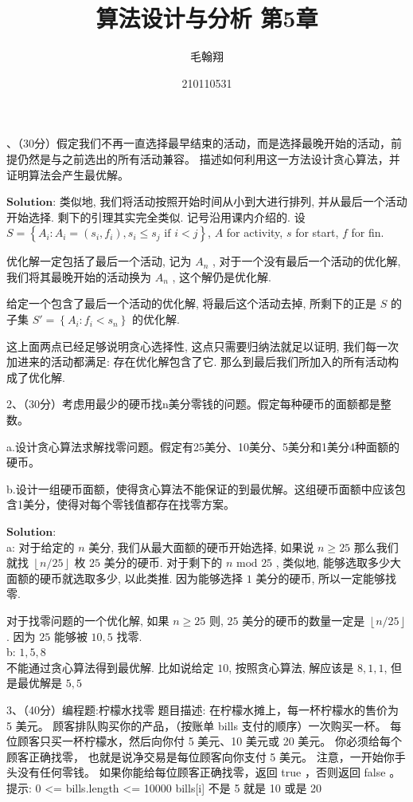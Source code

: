 \documentclass[a4paper, 10pt]{ctexart} %
\title{算法设计与分析 第5章}
\author{毛翰翔 \and 210110531}
\begin{document}
、（30分）假定我们不再一直选择最早结束的活动，而是选择最晚开始的活动，前提仍然是与之前选出的所有活动兼容。
描述如何利用这一方法设计贪心算法，并证明算法会产生最优解。

\vspace*{4ex}
$\mathbf{Solution}$: 类似地, 我们将活动按照开始时间从小到大进行排列, 并从最后一个活动开始选择. 剩下的引理其实完全类似. 记号沿用课内介绍的. 
设 $S = \left\{A_{i}:A_{i} = \left(s_{i}, f_{i}\right), s_i \le s_j \text{ if } i < j\right\}$, $A$ for activity, $s$ for start, $f$ for fin.

优化解一定包括了最后一个活动, 记为 $A_{n}$ , 对于一个没有最后一个活动的优化解, 我们将其最晚开始的活动换为 $A_{n}$ , 这个解仍是优化解. 

给定一个包含了最后一个活动的优化解, 将最后这个活动去掉, 所剩下的正是 $S$ 的子集 $S' = \left\{A_i : f_i < s_n \right\}$ 的优化解. 

这上面两点已经足够说明贪心选择性, 这点只需要归纳法就足以证明, 我们每一次加进来的活动都满足: 存在优化解包含了它. 那么到最后我们所加入的所有活动构成了优化解. 

\vspace*{4ex}
2、（30分）考虑用最少的硬币找n美分零钱的问题。假定每种硬币的面额都是整数。

a.设计贪心算法求解找零问题。假定有25美分、10美分、5美分和1美分4种面额的硬币。

b.设计一组硬币面额，使得贪心算法不能保证的到最优解。这组硬币面额中应该包含1美分，使得对每个零钱值都存在找零方案。

\vspace*{4ex}
\noindent $\mathbf{Solution}$: \\a: 对于给定的 $n$ 美分, 我们从最大面额的硬币开始选择, 如果说 $n \ge 25$ 那么我们就找 $\left\lfloor n / 25 \right\rfloor$ 枚 $25$ 美分的硬币. 
对于剩下的 $n \text{ mod } 25$ , 类似地, 能够选取多少大面额的硬币就选取多少, 以此类推.
因为能够选择 $1$ 美分的硬币, 所以一定能够找零. 

对于找零问题的一个优化解, 如果 $n \ge 25$ 则, $25$ 美分的硬币的数量一定是 $\left\lfloor n / 25 \right\rfloor$. 因为 $25$ 能够被 $10 , 5$ 找零. 
\\
b: $1 , 5, 8$ \\不能通过贪心算法得到最优解. 比如说给定 $10$, 按照贪心算法, 解应该是 $8, 1, 1$, 但是最优解是 $5  , 5$

\vspace*{4ex}
3、（40分）编程题:柠檬水找零
题目描述:
在柠檬水摊上，每一杯柠檬水的售价为 5 美元。
顾客排队购买你的产品，（按账单 bills 支付的顺序）一次购买一杯。
每位顾客只买一杯柠檬水，然后向你付 5 美元、10 美元或 20 美元。
你必须给每个顾客正确找零，
也就是说净交易是每位顾客向你支付 5 美元。
注意，一开始你手头没有任何零钱。
如果你能给每位顾客正确找零，返回 true ，否则返回 false 。
提示:
0 <= bills.length <= 10000
bills[i] 不是 5 就是 10 或是 20
\end{document}
